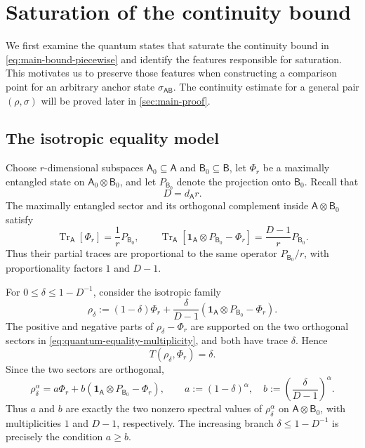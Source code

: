 \documentclass[11pt,reqno]{amsart}
\theoremstyle{definition}
\DeclareMathOperator{\Tr}{Tr}
\newcommand{\I}{\mathbf 1}
\newcommand{\A}{\mathsf{A}}
\newcommand{\B}{\mathsf{B}}
\begin{document}
\section{Saturation of the continuity bound}
\label{sec:quantum-model}

We first examine the quantum states that saturate the continuity bound in \cref{eq:main-bound-piecewise} and identify the features responsible for saturation.  
This motivates us to preserve those features when constructing a comparison point for an
arbitrary anchor state $\sigma_{\A\B}$.  
The continuity estimate for a general pair
$(\rho,\sigma)$ will be proved later in \cref{sec:main-proof}.

\subsection{The isotropic equality model}

Choose $r$-dimensional subspaces $\A_0\subseteq\A$ and
$\B_0\subseteq\B$, let $\Phi_r$ be a maximally entangled state on
$\A_0\otimes\B_0$, and let $P_{\B_0}$ denote the projection onto
$\B_0$.  Recall that
\[
D=d_{\A}r.
\]
The maximally entangled sector and its orthogonal complement inside
$\A\otimes\B_0$ satisfy
\begin{equation}\label{eq:quantum-equality-multiplicity}
	\Tr_{\A}[\Phi_r]=\frac1rP_{\B_0},
	\qquad
	\Tr_{\A}\!\left[
	\I_{\A}\otimes P_{\B_0}-\Phi_r
	\right]
	=\frac{D-1}{r}P_{\B_0}.
\end{equation}
Thus their partial traces are proportional to the same operator
$P_{\B_0}/r$, with proportionality factors $1$ and $D-1$.

For $0\leq\delta\leq1-D^{-1}$, consider the isotropic family
\begin{equation}\label{eq:quantum-equality-family}
	\rho_\delta
	:=
	(1-\delta)\Phi_r
	+\frac{\delta}{D-1}
	\left(
	\I_{\A}\otimes P_{\B_0}-\Phi_r
	\right).
\end{equation}
The positive and negative parts of $\rho_\delta-\Phi_r$ are supported on
the two orthogonal sectors in
\cref{eq:quantum-equality-multiplicity}, and both have trace $\delta$.
Hence
\begin{equation}\label{eq:isotropic-distance}
	T(\rho_\delta,\Phi_r)=\delta.
\end{equation}
Since the two sectors are orthogonal,
\begin{equation}\label{eq:root-equality-family}
	\rho_\delta^\alpha
	=
	a\Phi_r
	+b\left(
	\I_{\A}\otimes P_{\B_0}-\Phi_r
	\right),
	\qquad
	\boxed{
		a:=(1-\delta)^\alpha,
		\quad
		b:=\left(\frac{\delta}{D-1}\right)^\alpha.}
\end{equation}
Thus $a$ and $b$ are exactly the two nonzero spectral values of
$\rho_\delta^\alpha$ on $\A\otimes\B_0$, with multiplicities $1$ and
$D-1$, respectively.  The increasing branch
$\delta\leq1-D^{-1}$ is precisely the condition $a\geq b$.
\end{document}
